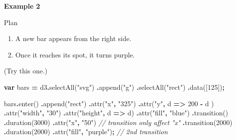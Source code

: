 \documentclass[
  openany]{book}
\newenvironment{Shaded}{\begin{snugshade}}{\end{snugshade}}
\newcommand{\CommentTok}[1]{\textcolor[rgb]{0.56,0.35,0.01}{\textit{#1}}}
\newcommand{\DecValTok}[1]{\textcolor[rgb]{0.00,0.00,0.81}{#1}}
\newcommand{\FunctionTok}[1]{\textcolor[rgb]{0.00,0.00,0.00}{#1}}
\newcommand{\KeywordTok}[1]{\textcolor[rgb]{0.13,0.29,0.53}{\textbf{#1}}}
\newcommand{\NormalTok}[1]{#1}
\newcommand{\OperatorTok}[1]{\textcolor[rgb]{0.81,0.36,0.00}{\textbf{#1}}}
\newcommand{\StringTok}[1]{\textcolor[rgb]{0.31,0.60,0.02}{#1}}
\begin{document}
\textbf{Example 2}

Plan

\begin{enumerate}
\def\labelenumi{\arabic{enumi}.}
\item
  A new bar appears from the right side.
\item
  Once it reaches its spot, it turns purple.
\end{enumerate}

(Try this one.)

\begin{Shaded}
\begin{Highlighting}[]
\KeywordTok{var}\NormalTok{ bars }\OperatorTok{=}\NormalTok{ d3}\OperatorTok{.}\FunctionTok{selectAll}\NormalTok{(}\StringTok{"svg"}\NormalTok{)}
  \OperatorTok{.}\FunctionTok{append}\NormalTok{(}\StringTok{"g"}\NormalTok{)}
  \OperatorTok{.}\FunctionTok{selectAll}\NormalTok{(}\StringTok{"rect"}\NormalTok{)}
  \OperatorTok{.}\FunctionTok{data}\NormalTok{([}\DecValTok{125}\NormalTok{])}\OperatorTok{;}
  
\NormalTok{bars}\OperatorTok{.}\FunctionTok{enter}\NormalTok{()                 }
  \OperatorTok{.}\FunctionTok{append}\NormalTok{(}\StringTok{"rect"}\NormalTok{)}
    \OperatorTok{.}\FunctionTok{attr}\NormalTok{(}\StringTok{"x"}\OperatorTok{,} \StringTok{"325"}\NormalTok{)}
    \OperatorTok{.}\FunctionTok{attr}\NormalTok{(}\StringTok{"y"}\OperatorTok{,}\NormalTok{ d }\KeywordTok{=\textgreater{}} \DecValTok{200} \OperatorTok{{-}}\NormalTok{ d )}
    \OperatorTok{.}\FunctionTok{attr}\NormalTok{(}\StringTok{"width"}\OperatorTok{,} \StringTok{"30"}\NormalTok{)}
    \OperatorTok{.}\FunctionTok{attr}\NormalTok{(}\StringTok{"height"}\OperatorTok{,}\NormalTok{ d }\KeywordTok{=\textgreater{}}\NormalTok{ d)}
    \OperatorTok{.}\FunctionTok{attr}\NormalTok{(}\StringTok{"fill"}\OperatorTok{,} \StringTok{"blue"}\NormalTok{)}
  \OperatorTok{.}\FunctionTok{transition}\NormalTok{()}
  \OperatorTok{.}\FunctionTok{duration}\NormalTok{(}\DecValTok{3000}\NormalTok{)}
    \OperatorTok{.}\FunctionTok{attr}\NormalTok{(}\StringTok{"x"}\OperatorTok{,} \StringTok{"50"}\NormalTok{)   }\CommentTok{// transition only affect "x"}
  \OperatorTok{.}\FunctionTok{transition}\NormalTok{(}\DecValTok{2000}\NormalTok{)}
  \OperatorTok{.}\FunctionTok{duration}\NormalTok{(}\DecValTok{2000}\NormalTok{)}
    \OperatorTok{.}\FunctionTok{attr}\NormalTok{(}\StringTok{"fill"}\OperatorTok{,} \StringTok{"purple"}\NormalTok{)}\OperatorTok{;}  \CommentTok{// 2nd transition}
\end{Highlighting}
\end{Shaded}
\end{document}
